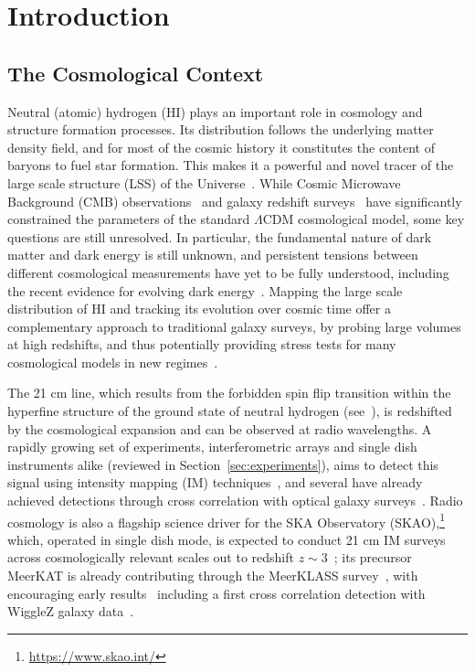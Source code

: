 



\pagestyle{plain}
\chapter{Introduction}
\label{ch:introduction}


\section{The Cosmological Context}
\label{sec:cosmological_context}

Neutral (atomic) hydrogen (HI) plays an important role in cosmology and structure formation processes. Its distribution follows the underlying matter density field, and for most of the cosmic history it constitutes the content of baryons to fuel star formation. This makes it a powerful and novel tracer of the large scale structure (LSS) of the Universe~\citep[e.g.][]{review,Ansari_2012,Santos:2015,villa14}. While Cosmic Microwave Background (CMB) observations~\citep{WMAP,planck:2018,ACT} and galaxy redshift surveys~\citep[e.g.][]{BOSS:2016} have significantly constrained the parameters of the standard $\Lambda$CDM cosmological model, some key questions are still unresolved. In particular, the fundamental nature of dark matter and dark energy is still unknown, and persistent tensions between different cosmological measurements have yet to be fully understood, including the recent evidence for evolving dark energy~\citep[e.g.][]{riess:2019,Verde:2019,wong:2019,DESIde}. Mapping the large scale distribution of HI and tracking its evolution over cosmic time offer a complementary approach to traditional galaxy surveys, by probing large volumes at high redshifts, and thus potentially providing stress tests for many cosmological models in new regimes~\citep[e.g.][]{bull:2015,villa15,obuljen_high-redshift_2018,berti_constraining_2022,Villaescusa-Navarro:2016}.


The 21 cm line, which results from the forbidden spin flip transition within the hyperfine structure of the ground state of neutral hydrogen (see~\citet{Furlanetto:2006}), is redshifted by the cosmological expansion and can be observed at radio wavelengths. A rapidly growing set of experiments, interferometric arrays and single dish instruments alike (reviewed in Section~\ref{sec:experiments}), aims to detect this signal using intensity mapping (IM) techniques~\citep{Bharadwaj:2000,Battye:2004,McQuinn:2005,Chang:2007,Seo:2009fq,Battye:2013,Kovetz:2017}, and several have already achieved detections through cross correlation with optical galaxy surveys~\citep{Chang2010,Masui2013,Anderson2018,Wolz2022,Cunnington:2022,Paul2023}. Radio cosmology is also a flagship science driver for the SKA Observatory (SKAO),\footnote{\url{https://www.skao.int/}} which, operated in single dish mode, is expected to conduct 21 cm IM surveys across cosmologically relevant scales out to redshift $z\sim3$~\citep{Santos:2015,Bacon:2018}; its precursor MeerKAT is already contributing through the MeerKLASS survey~\citep{Santos:2017}, with encouraging early results~\citep{Wang:2021,irfan2022} including a first cross correlation detection with WiggleZ galaxy data~\citep{Cunnington:2022uzo}.


